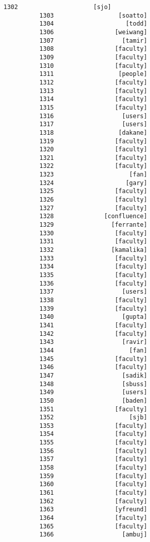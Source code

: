 \documentclass[11pt]{article}
\begin{document}
\begin{Verbatim}[commandchars=\\\{\}]
          1302                     [sjo]
          1303                  [soatto]
          1304                    [todd]
          1306                 [weiwang]
          1307                   [tamir]
          1308                 [faculty]
          1309                 [faculty]
          1310                 [faculty]
          1311                  [people]
          1312                 [faculty]
          1313                 [faculty]
          1314                 [faculty]
          1315                 [faculty]
          1316                   [users]
          1317                   [users]
          1318                  [dakane]
          1319                 [faculty]
          1320                 [faculty]
          1321                 [faculty]
          1322                 [faculty]
          1323                     [fan]
          1324                    [gary]
          1325                 [faculty]
          1326                 [faculty]
          1327                 [faculty]
          1328              [confluence]
          1329                [ferrante]
          1330                 [faculty]
          1331                 [faculty]
          1332                [kamalika]
          1333                 [faculty]
          1334                 [faculty]
          1335                 [faculty]
          1336                 [faculty]
          1337                   [users]
          1338                 [faculty]
          1339                 [faculty]
          1340                   [gupta]
          1341                 [faculty]
          1342                 [faculty]
          1343                   [ravir]
          1344                     [fan]
          1345                 [faculty]
          1346                 [faculty]
          1347                   [sadik]
          1348                   [sbuss]
          1349                   [users]
          1350                   [baden]
          1351                 [faculty]
          1352                     [sjb]
          1353                 [faculty]
          1354                 [faculty]
          1355                 [faculty]
          1356                 [faculty]
          1357                 [faculty]
          1358                 [faculty]
          1359                 [faculty]
          1360                 [faculty]
          1361                 [faculty]
          1362                 [faculty]
          1363                 [yfreund]
          1364                 [faculty]
          1365                 [faculty]
          1366                   [ambuj]

\end{Verbatim}
\end{document}
